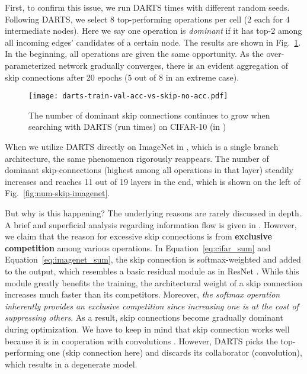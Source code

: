 \documentclass[runningheads]{llncs}
\begin{document}
First, to confirm this issue, we run DARTS  times with different random seeds. Following DARTS, we select 8 top-performing operations per cell (2 each for 4 intermediate nodes).  Here we say one operation is \emph{dominant} if it has top-2  among all incoming edges' candidates of a certain node. The results are shown in Fig.~\ref{fig:num-skip-cifar}. In the beginning, all operations are given the same opportunity. As the over-parameterized network gradually converges, there is an evident aggregation of skip connections after 20 epochs (5 out of 8 in an extreme case).

\begin{figure}[ht]
	\centering
	\texttt{[image: darts-train-val-acc-vs-skip-no-acc.pdf]}
\caption{The number of dominant skip connections continues to grow when searching with DARTS (run  times) on CIFAR-10 (in )}
	\label{fig:num-skip-cifar}
\end{figure}



When we utilize DARTS directly on ImageNet in , which is a single branch architecture, the same phenomenon rigorously reappears. The number of dominant skip-connections (highest  among all operations in that layer) steadily increases and reaches 11 out of 19 layers  in the end, which is shown on the left of Fig.~\ref{fig:num-skip-imagenet}. 



But why is this happening? The underlying reasons are rarely discussed in depth. A brief and superficial analysis regarding information flow is given in \cite{chen2019progressive}. However, we claim that the reason for excessive skip connections is from \textbf{exclusive competition} among various operations. In Equation~\ref{eq:cifar_sum} and Equation~\ref{eq:imagenet_sum}, the skip connection is softmax-weighted and added to the output, which resembles a basic residual module as in ResNet \cite{he2016deep}. While this module greatly benefits the training, the architectural weight of a skip connection increases much faster than its competitors. Moreover,  \emph{the softmax operation inherently provides an exclusive competition since increasing one is at the cost of suppressing others}. As a result, skip connections become gradually dominant during optimization.  
We have to keep in mind that skip connection works well because it is in cooperation with convolutions \cite{he2016deep}. 
However, DARTS picks the top-performing one (skip connection here) and discards its collaborator (convolution), which results in a degenerate model.
\end{document}
